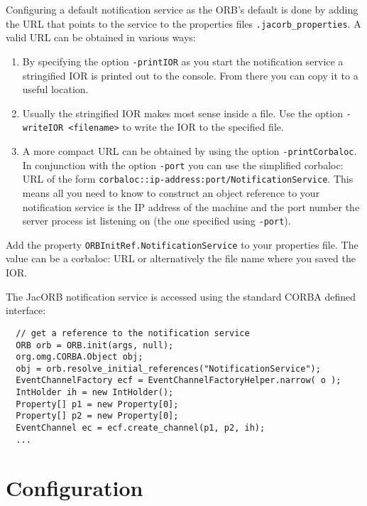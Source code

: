Configuring a default notification service as the ORB's default is done
by adding the URL that points to the service to the properties files
\texttt{.jacorb\_properties}. A valid URL can be obtained in various ways:
\begin{enumerate}
\item By specifying the option \texttt{-printIOR} as you start the
  notification service a stringified IOR is printed out to the
  console. From there you can copy it to a useful location.

\item Usually the stringified IOR makes most sense inside a file. Use
  the option \texttt{-writeIOR <filename>} to write the IOR to the specified
  file.

\item A more compact URL can be obtained by using the
  option \texttt{-printCorbaloc}. In conjunction with the option
  \texttt{-port} you can use the simplified corbaloc: URL of the form
  \texttt{corbaloc::ip-address:port/NotificationService}. This means
  all you need to know to construct an object reference to your
  notification service is the IP address of the machine and the port
  number the server process ist listening on (the one specified using
  \texttt{-port}).

\end{enumerate}

Add the property \texttt{ORBInitRef.NotificationService} to your
properties file. The value can be a corbaloc: URL or alternatively the
file name where you saved the IOR.

The JacORB notification service is accessed using the standard CORBA
defined interface:

\small{
\begin{verbatim}
  // get a reference to the notification service
  ORB orb = ORB.init(args, null);
  org.omg.CORBA.Object obj;
  obj = orb.resolve_initial_references("NotificationService");
  EventChannelFactory ecf = EventChannelFactoryHelper.narrow( o );
  IntHolder ih = new IntHolder();
  Property[] p1 = new Property[0];
  Property[] p2 = new Property[0];
  EventChannel ec = ecf.create_channel(p1, p2, ih);
  ...
\end{verbatim}
}

\section{Configuration}
\label{sec:ntfy-configuration}

